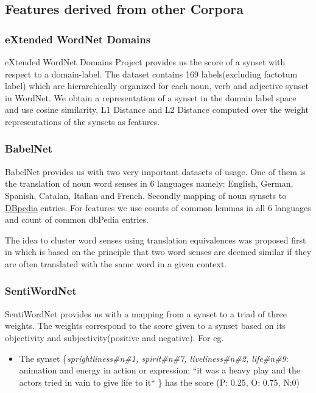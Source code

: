 \subsection{Features derived from other Corpora}
\subsubsection{eXtended WordNet Domains} eXtended WordNet Domains Project \citep{Gonzalez:XWND} provides us the score of a synset with respect to a domain-label. The dataset contains 169 labels(excluding factotum label) which are hierarchically organized for each noun, verb and adjective synset in WordNet. We obtain a representation of a synset in the domain label space and use cosine similarity, L1 Distance and L2 Distance computed over the weight representations of the synsets as features.

\subsubsection{BabelNet} BabelNet \citep{NavigliPonzetto:12aij} provides us with two very important datasets of usage. 
One of them is the translation of noun word senses in 6 languages namely: English, German, Spanish, Catalan, Italian and French. Secondly mapping of noun synsets to  \href{http://dbpedia.org/About}{DBpedia} entries. 
For features we use counts of common lemmas in all 6 languages and count of common dbPedia entries.

The idea to cluster word senses using translation equivalences was proposed first in \citep{Resnik:1999:TranslationEquivalences} which is based on the principle that two word senses are deemed similar if they are often translated with the same word in a given context.

\subsubsection{SentiWordNet} SentiWordNet \citep{Baccianella10sentiwordnet3.0} provides us with a mapping from a synset to a triad of three weights. The weights correspond to the score given to a synset based on its objectivity and subjectivity(positive and negative). For eg.
\begin{itemize}
\item The synset \{\textit{sprightliness\#n\#1, spirit\#n\#7,  liveliness\#n\#2,  life\#n\#9}: animation and energy in action or expression; ``it was a heavy play and the actors tried in vain to give life to it`` \} has the score (P: 0.25, O: 0.75, N:0)
\end{itemize}

